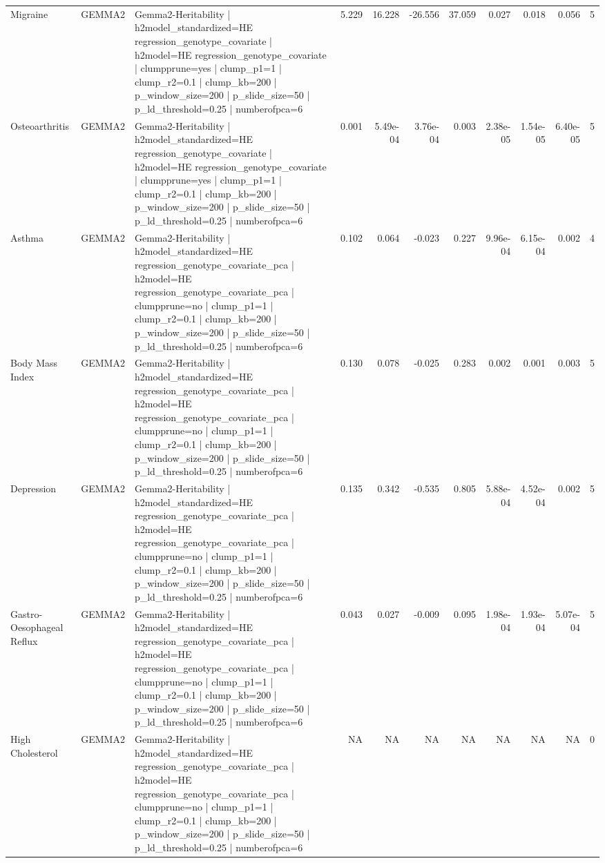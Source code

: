 \begin{landscape}
\begin{longtable}{p{2.4cm}p{1.8cm}p{6.0cm}rrrrrrrr}
Migraine & GEMMA2 & Gemma2-Heritability | h2model\_standardized=HE regression\_genotype\_covariate | h2model=HE regression\_genotype\_covariate | clumpprune=yes | clump\_p1=1 | clump\_r2=0.1 | clump\_kb=200 | p\_window\_size=200 | p\_slide\_size=50 | p\_ld\_threshold=0.25 | numberofpca=6 & 5.229 & 16.228 & -26.556 & 37.059 & 0.027 & 0.018 & 0.056 & 5 \\
Osteoarthritis & GEMMA2 & Gemma2-Heritability | h2model\_standardized=HE regression\_genotype\_covariate | h2model=HE regression\_genotype\_covariate | clumpprune=yes | clump\_p1=1 | clump\_r2=0.1 | clump\_kb=200 | p\_window\_size=200 | p\_slide\_size=50 | p\_ld\_threshold=0.25 | numberofpca=6 & 0.001 & 5.49e-04 & 3.76e-04 & 0.003 & 2.38e-05 & 1.54e-05 & 6.40e-05 & 5 \\
Asthma & GEMMA2 & Gemma2-Heritability | h2model\_standardized=HE regression\_genotype\_covariate\_pca | h2model=HE regression\_genotype\_covariate\_pca | clumpprune=no | clump\_p1=1 | clump\_r2=0.1 | clump\_kb=200 | p\_window\_size=200 | p\_slide\_size=50 | p\_ld\_threshold=0.25 | numberofpca=6 & 0.102 & 0.064 & -0.023 & 0.227 & 9.96e-04 & 6.15e-04 & 0.002 & 4 \\
Body Mass Index & GEMMA2 & Gemma2-Heritability | h2model\_standardized=HE regression\_genotype\_covariate\_pca | h2model=HE regression\_genotype\_covariate\_pca | clumpprune=no | clump\_p1=1 | clump\_r2=0.1 | clump\_kb=200 | p\_window\_size=200 | p\_slide\_size=50 | p\_ld\_threshold=0.25 | numberofpca=6 & 0.130 & 0.078 & -0.025 & 0.283 & 0.002 & 0.001 & 0.003 & 5 \\
Depression & GEMMA2 & Gemma2-Heritability | h2model\_standardized=HE regression\_genotype\_covariate\_pca | h2model=HE regression\_genotype\_covariate\_pca | clumpprune=no | clump\_p1=1 | clump\_r2=0.1 | clump\_kb=200 | p\_window\_size=200 | p\_slide\_size=50 | p\_ld\_threshold=0.25 | numberofpca=6 & 0.135 & 0.342 & -0.535 & 0.805 & 5.88e-04 & 4.52e-04 & 0.002 & 5 \\
Gastro-Oesophageal Reflux & GEMMA2 & Gemma2-Heritability | h2model\_standardized=HE regression\_genotype\_covariate\_pca | h2model=HE regression\_genotype\_covariate\_pca | clumpprune=no | clump\_p1=1 | clump\_r2=0.1 | clump\_kb=200 | p\_window\_size=200 | p\_slide\_size=50 | p\_ld\_threshold=0.25 | numberofpca=6 & 0.043 & 0.027 & -0.009 & 0.095 & 1.98e-04 & 1.93e-04 & 5.07e-04 & 5 \\
High Cholesterol & GEMMA2 & Gemma2-Heritability | h2model\_standardized=HE regression\_genotype\_covariate\_pca | h2model=HE regression\_genotype\_covariate\_pca | clumpprune=no | clump\_p1=1 | clump\_r2=0.1 | clump\_kb=200 | p\_window\_size=200 | p\_slide\_size=50 | p\_ld\_threshold=0.25 | numberofpca=6 & NA & NA & NA & NA & NA & NA & NA & 0 \\

\end{longtable}
\end{landscape}
